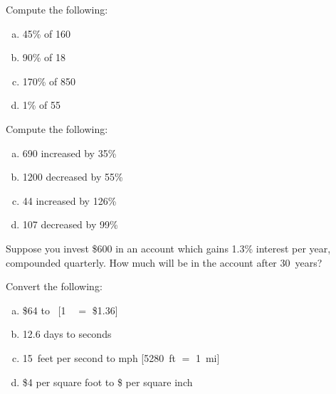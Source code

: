 \documentclass[11pt,letterpaper]{article}
\begin{document}

 Compute the following:
	\begin{enumerate}[(a)]
	\item 45\% of 160
	\item 90\% of 18
	\item 170\% of 850
	\item 1\% of 55
	\end{enumerate}



\newpage



 Compute the following:
	\begin{enumerate}[(a)]
	\item 690 increased by 35\%
	\item 1200 decreased by 55\%
	\item 44 increased by 126\%
	\item 107 decreased by 99\%
	\end{enumerate}



\newpage



 Suppose you invest \$600 in an account which gains 1.3\% interest per year, compounded quarterly. How much will be in the account after 30~years?



\newpage



 Convert the following:
	\begin{enumerate}[(a)]
	\item \$64 to \textsterling\ [1~\textsterling\ $=$ \$1.36]
	\item 12.6 days to seconds
	\item 15~feet per second to mph [5280~ft $=$ 1~mi]
	\item \$4 per square foot to \$ per square inch
	\end{enumerate}
\end{document}
